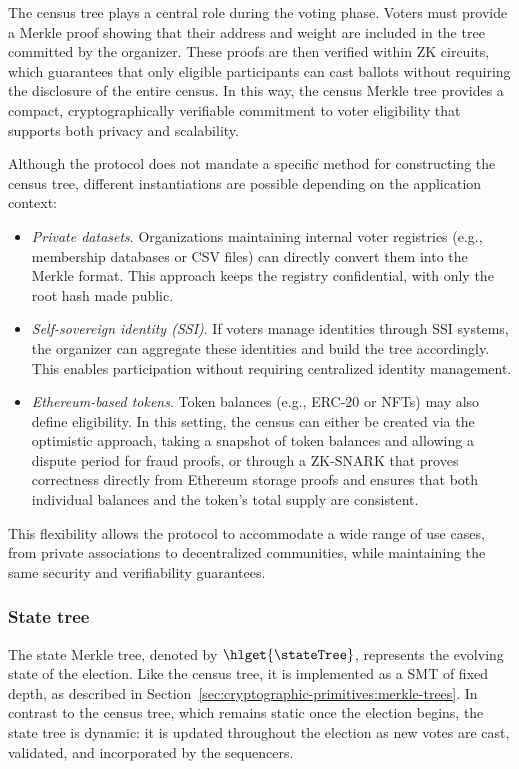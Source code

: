 The census tree plays a central role during the voting phase. Voters must provide a Merkle proof showing that their address and weight are included in the tree committed by the organizer. These proofs are then verified within ZK circuits, which guarantees that only eligible participants can cast ballots without requiring the disclosure of the entire census. In this way, the census Merkle tree provides a compact, cryptographically verifiable commitment to voter eligibility that supports both privacy and scalability.

Although the protocol does not mandate a specific method for constructing the census tree, different instantiations are possible depending on the application context:
%
\begin{itemize}
	\item \emph{Private datasets}. Organizations maintaining internal voter registries (e.g., membership databases or CSV files) can directly convert them into the Merkle format. This approach keeps the registry confidential, with only the root hash made public.
	\item \emph{Self-sovereign identity (SSI)}. If voters manage identities through SSI systems, the organizer can aggregate these identities and build 
	the tree accordingly. This enables participation without requiring centralized identity management.
	\item \textit{Ethereum-based tokens}. Token balances (e.g., ERC-20 or NFTs) may also define eligibility. In this setting, the census can either be created via the optimistic approach, taking a snapshot of token balances and allowing a dispute period for fraud proofs, or through a ZK-SNARK that proves correctness directly from Ethereum storage proofs and ensures that both individual balances and the token’s total supply are consistent. 
\end{itemize}
%
This flexibility allows the protocol to accommodate a wide range of use cases, from private associations to decentralized communities, while maintaining the same security and verifiability guarantees.

\subsubsection{State tree} 
\label{sec:vocdoni-protocol:merkle-trees:state}

The state Merkle tree, denoted by $\hlget{\stateTree}$, represents the evolving state of the election. Like the census tree, it is implemented as a SMT of fixed depth, as described in Section~\ref{sec:cryptographic-primitives:merkle-trees}. In contrast to the census tree, which remains static once the election begins, the state tree is dynamic: it is updated throughout the election as new votes are cast, validated, and incorporated by the sequencers.

